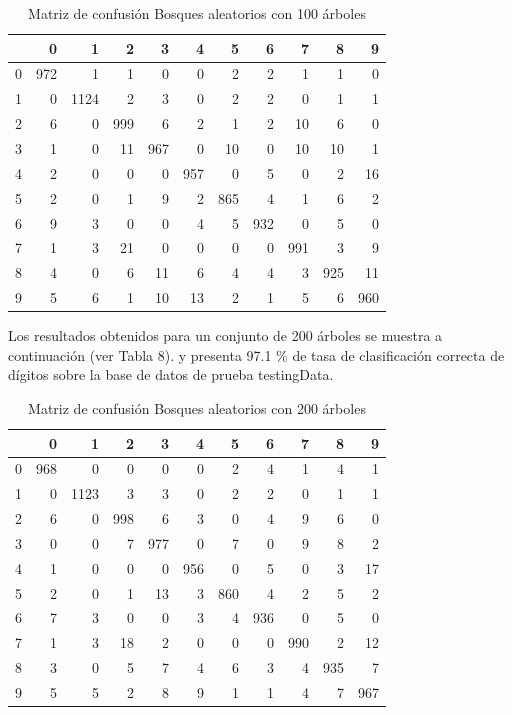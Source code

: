 \documentclass{article}
\begin{document}
\begin{table}[H]
\caption{\small{Matriz de confusión Bosques aleatorios con 100 árboles}}
\centering
\begin{tabular}{r|rrrrrrrrrr}
  \hline
 & 0 & 1 & 2 & 3 & 4 & 5 & 6 & 7 & 8 & 9 \\ 
  \hline
0 & 972 &   1 &   1 &   0 &   0 &   2 &   2 &   1 &   1 &   0 \\ 
  1 &   0 & 1124 &   2 &   3 &   0 &   2 &   2 &   0 &   1 &   1 \\ 
  2 &   6 &   0 & 999 &   6 &   2 &   1 &   2 &  10 &   6 &   0 \\ 
  3 &   1 &   0 &  11 & 967 &   0 &  10 &   0 &  10 &  10 &   1 \\ 
  4 &   2 &   0 &   0 &   0 & 957 &   0 &   5 &   0 &   2 &  16 \\ 
  5 &   2 &   0 &   1 &   9 &   2 & 865 &   4 &   1 &   6 &   2 \\ 
  6 &   9 &   3 &   0 &   0 &   4 &   5 & 932 &   0 &   5 &   0 \\ 
  7 &   1 &   3 &  21 &   0 &   0 &   0 &   0 & 991 &   3 &   9 \\ 
  8 &   4 &   0 &   6 &  11 &   6 &   4 &   4 &   3 & 925 &  11 \\ 
  9 &   5 &   6 &   1 &  10 &  13 &   2 &   1 &   5 &   6 & 960 \\ 
   \hline
\end{tabular}
\end{table}


Los resultados obtenidos para un conjunto de 200 árboles se muestra a continuación (ver Tabla 8). 
y presenta 97.1 \% de  tasa de clasificación correcta de dígitos sobre la base de datos de prueba testingData. 

\begin{table}[H]
\caption{\small{Matriz de confusión Bosques aleatorios con 200 árboles}}
\centering
\begin{tabular}{r|rrrrrrrrrr}
  \hline
 & 0 & 1 & 2 & 3 & 4 & 5 & 6 & 7 & 8 & 9 \\ 
  \hline
0 & 968 &   0 &   0 &   0 &   0 &   2 &   4 &   1 &   4 &   1 \\ 
  1 &   0 & 1123 &   3 &   3 &   0 &   2 &   2 &   0 &   1 &   1 \\ 
  2 &   6 &   0 & 998 &   6 &   3 &   0 &   4 &   9 &   6 &   0 \\ 
  3 &   0 &   0 &   7 & 977 &   0 &   7 &   0 &   9 &   8 &   2 \\ 
  4 &   1 &   0 &   0 &   0 & 956 &   0 &   5 &   0 &   3 &  17 \\ 
  5 &   2 &   0 &   1 &  13 &   3 & 860 &   4 &   2 &   5 &   2 \\ 
  6 &   7 &   3 &   0 &   0 &   3 &   4 & 936 &   0 &   5 &   0 \\ 
  7 &   1 &   3 &  18 &   2 &   0 &   0 &   0 & 990 &   2 &  12 \\ 
  8 &   3 &   0 &   5 &   7 &   4 &   6 &   3 &   4 & 935 &   7 \\ 
  9 &   5 &   5 &   2 &   8 &   9 &   1 &   1 &   4 &   7 & 967 \\ 
   \hline
\end{tabular}
\end{table}
\end{document}

